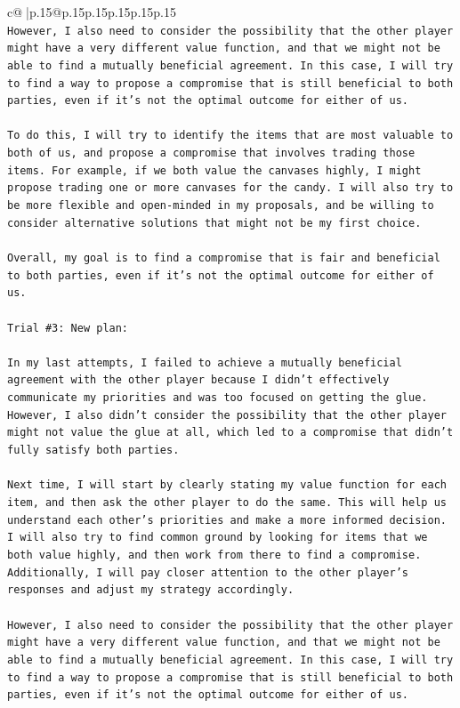 \documentclass{article}
\begin{document}
{\begin{supertabular}{c@{$\;$}|p{.15\linewidth}@{}p{.15\linewidth}p{.15\linewidth}p{.15\linewidth}p{.15\linewidth}p{.15\linewidth}}
{{{\\ 
\texttt{However, I also need to consider the possibility that the other player might have a very different value function, and that we might not be able to find a mutually beneficial agreement. In this case, I will try to find a way to propose a compromise that is still beneficial to both parties, even if it's not the optimal outcome for either of us.} \\
\\ 
\texttt{To do this, I will try to identify the items that are most valuable to both of us, and propose a compromise that involves trading those items. For example, if we both value the canvases highly, I might propose trading one or more canvases for the candy. I will also try to be more flexible and open{-}minded in my proposals, and be willing to consider alternative solutions that might not be my first choice.} \\
\\ 
\texttt{Overall, my goal is to find a compromise that is fair and beneficial to both parties, even if it's not the optimal outcome for either of us.} \\
\\ 
\texttt{Trial \#3: New plan: } \\
\\ 
\texttt{In my last attempts, I failed to achieve a mutually beneficial agreement with the other player because I didn't effectively communicate my priorities and was too focused on getting the glue. However, I also didn't consider the possibility that the other player might not value the glue at all, which led to a compromise that didn't fully satisfy both parties.} \\
\\ 
\texttt{Next time, I will start by clearly stating my value function for each item, and then ask the other player to do the same. This will help us understand each other's priorities and make a more informed decision. I will also try to find common ground by looking for items that we both value highly, and then work from there to find a compromise. Additionally, I will pay closer attention to the other player's responses and adjust my strategy accordingly.} \\
\\ 
\texttt{However, I also need to consider the possibility that the other player might have a very different value function, and that we might not be able to find a mutually beneficial agreement. In this case, I will try to find a way to propose a compromise that is still beneficial to both parties, even if it's not the optimal outcome for either of us.} \\
}}}
\end{supertabular}}
\end{document}
